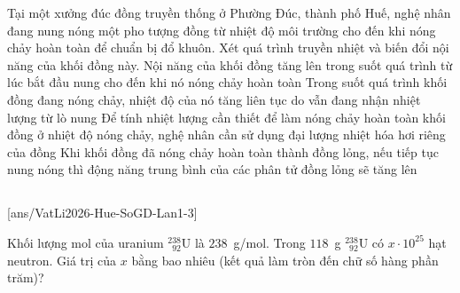 	\begin{ex}%
		Tại một xưởng đúc đồng truyền thống ở Phường Đúc, thành phố Huế, nghệ nhân đang nung nóng một pho tượng đồng từ nhiệt độ môi trường cho đến khi nóng chảy hoàn toàn để chuẩn bị đổ khuôn. Xét quá trình truyền nhiệt và biến đổi nội năng của khối đồng này.
		\choiceTFt
		{\True Nội năng của khối đồng tăng lên trong suốt quá trình từ lúc bắt đầu nung cho đến khi nó nóng chảy hoàn toàn}
		{Trong suốt quá trình khối đồng đang nóng chảy, nhiệt độ của nó tăng liên tục do vẫn đang nhận nhiệt lượng từ lò nung}
		{Để tính nhiệt lượng cần thiết để làm nóng chảy hoàn toàn khối đồng ở nhiệt độ nóng chảy, nghệ nhân cần sử dụng đại lượng nhiệt hóa hơi riêng của đồng}
		{\True Khi khối đồng đã nóng chảy hoàn toàn thành đồng lỏng, nếu tiếp tục nung nóng thì động năng trung bình của các phân tử đồng lỏng sẽ tăng lên}
	\end{ex}

	\subsection*{}
	\setcounter{ex}{0}
	[ans/VatLi2026-Hue-SoGD-Lan1-3]

	\begin{ex}%
		Khối lượng mol của uranium $^{238}_{\phantom{2}92}\text{U}$ là $238$~g/mol. Trong $118$~g $^{238}_{\phantom{2}92}\text{U}$ có $x\cdot 10^{25}$ hạt neutron. Giá trị của $x$ bằng bao nhiêu (kết quả làm tròn đến chữ số hàng phần trăm)?
		\par
	\end{ex}

